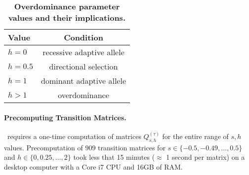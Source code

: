 \begin{table}
	\centering
	\caption{\bf Overdominance parameter values and their implications.}
	\begin{tabular}{l|c}
		Value & Condition\\
		\hline
		$h=0$ & recessive adaptive allele\\
		$h=0.5$ & directional selection\\
		$h=1$&	dominant adaptive allele	\\
		$h>1$ &overdominance
	\end{tabular}\label{tab:h}
\end{table}


\paragraph{Precomputing Transition Matrices.}
\comale\ requires a one-time computation of matrices
$Q^{(\tau)}_{s,h}$ for the entire range of $s,h$
values. Precomputation of $909$ transition matrices for
$s\in\{-0.5,-0.49,\ldots,0.5 \}$ and $h\in \{0,0.25,\ldots,2\}$ took
less that 15 minutes ($\approx$ 1 second per matrix) on a desktop
computer with a Core i7 CPU and 16GB of RAM.

